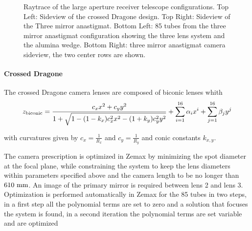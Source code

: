 \documentclass{article}
\begin{document}
\begin{figure}
	\caption{Raytrace of the large aperture receiver telescope configurations. Top Left: Sideview of the crossed Dragone design. Top Right: Sideview of the Three mirror anastigmat. Bottom Left: 85 tubes from the three mirror anastigmat configuration showing the three lens system and the alumina wedge. Bottom Right: three mirror anastigmat camera sideview, the two center rows are shown.}
	\label{fig:opticsDesign}
\end{figure}

\paragraph{Crossed Dragone} The crossed Dragone camera lenses are composed of biconic lenses whith \begin{equation}
	z_{\rm{biconic}} = \frac{c_x x^2 + c_y y^2}{1+ \sqrt{1-(1-k_x)c_x^2 x^2-(1+k_y)c_y^2y^2}} + \sum_{i=1}^{16} \alpha_i x^i + \sum_{j=1}^{16} \beta_j y^j 
\end{equation}

with curvatures given by  $c_x=\frac{1}{R_x}$ and $c_y=\frac{1}{R_y}$ and conic constants $k_{x,y}$.

The camera prescription is optimized in Zemax by minimizing the spot diameter at the focal plane, while constraining the system to keep the lens diameters within parameters specified above and the camera length to be no longer than $610 ~\rm mm$. An image of the primary mirror is required between lens 2 and lens 3. Optimization is performed automatically in Zemax for the 85 tubes in two steps, in a first step all the polynomial terms are set to zero and a solution that focuses the system is found, in a second iteration the polynomial terms are set variable and are optimized
\end{document}

